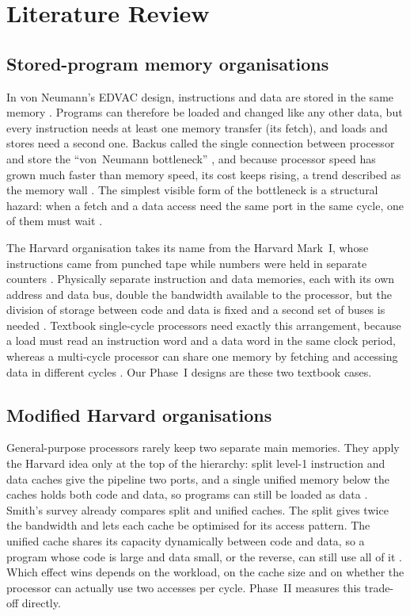 \section{Literature Review}
\subsection{Stored-program memory organisations}
In von Neumann's EDVAC design, instructions and data are stored in the same memory
\cite{vonneumann1945}. Programs can therefore be loaded and changed like any other data, but
every instruction needs at least one memory transfer (its fetch), and loads and stores need a
second one. Backus called the single connection between processor and store the
``von~Neumann bottleneck'' \cite{backus1978}, and because processor speed has grown much faster
than memory speed, its cost keeps rising, a trend described as the memory wall \cite{wulf1995}.
The simplest visible form of the bottleneck is a structural hazard: when a fetch and a data
access need the same port in the same cycle, one of them must wait \cite{hp_quant}.

The Harvard organisation takes its name from the Harvard Mark~I, whose instructions came from
punched tape while numbers were held in separate counters \cite{aiken1946}. Physically separate
instruction and data memories, each with its own address and data bus, double the bandwidth
available to the processor, but the division of storage between code and data is fixed and a
second set of buses is needed \cite{hp_quant}. Textbook single-cycle processors need exactly this
arrangement, because a load must read an instruction word and a data word in the same clock
period, whereas a multi-cycle processor can share one memory by fetching and accessing data in
different cycles \cite{ph_riscv,harris_riscv}. Our Phase~I designs are these two textbook cases.

\subsection{Modified Harvard organisations}
General-purpose processors rarely keep two separate main memories. They apply the Harvard idea
only at the top of the hierarchy: split level-1 instruction and data caches give the pipeline
two ports, and a single unified memory below the caches holds both code and data, so programs can
still be loaded as data \cite{hp_quant,ph_riscv}. Smith's survey already compares split and
unified caches. The split gives twice the bandwidth and lets each cache be optimised for its
access pattern. The unified cache shares its capacity dynamically between code and data, so a
program whose code is large and data small, or the reverse, can still use all of it
\cite{smith1982}. Which effect wins depends on the workload, on the cache size and on whether the
processor can actually use two accesses per cycle. Phase~II measures this trade-off directly.
